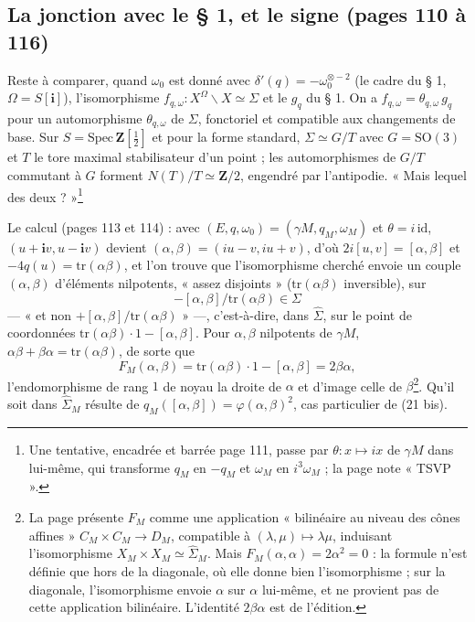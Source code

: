 \documentclass[11pt,a4paper]{article}
\begin{document}
\subsection*{La jonction avec le § 1, et le signe (pages 110 à 116)}

Reste à comparer, quand $\omega_0$ est donné avec $\delta'(q) = -\omega_0^{\otimes -2}$
(le cadre du § 1, $\Omega = S[\mathbf{i}]$), l'isomorphisme $f_{q, \omega} :
X^{\Omega} \smallsetminus X \simeq \Sigma$ et le $g_q$ du § 1. On a $f_{q, \omega} =
\theta_{q, \omega}\, g_q$ pour un automorphisme $\theta_{q, \omega}$ de $\Sigma$,
fonctoriel et compatible aux changements de base. Sur $S = \mathrm{Spec}\,
\mathbf{Z}[\tfrac{1}{2}]$ et pour la forme standard, $\Sigma \simeq G/T$ avec $G =
\mathrm{SO}(3)$ et $T$ le tore maximal stabilisateur d'un point ; les automorphismes
de $G/T$ commutant à $G$ forment $N(T)/T \simeq \mathbf{Z}/2$, engendré par
l'antipodie. « Mais lequel des deux ? »\footnote{Une tentative, encadrée et barrée
page 111, passe par $\theta : x \mapsto ix$ de $\gamma M$ dans lui-même, qui transforme
$q_M$ en $-q_M$ et $\omega_M$ en $i^3\omega_M$ ; la page note « TSVP ».}

Le calcul (pages 113 et 114) : avec $(E, q, \omega_0) = (\gamma M, q_M, \omega_M)$ et
$\theta = i\,\mathrm{id}$, $(u + \mathbf{i}v, u - \mathbf{i}v)$ devient $(\alpha,
\beta) = (iu - v, iu + v)$, d'où $2i[u, v] = [\alpha, \beta]$ et $-4q(u) =
\mathrm{tr}(\alpha\beta)$, et l'on trouve que l'isomorphisme cherché envoie un couple
$(\alpha, \beta)$ d'éléments nilpotents, « assez disjoints » ($\mathrm{tr}(\alpha\beta)$
inversible), sur
\[
  -[\alpha, \beta]/\mathrm{tr}(\alpha\beta) \in \Sigma
\]
— « et non $+[\alpha, \beta]/\mathrm{tr}(\alpha\beta)$ » —, c'est-à-dire, dans
$\hat{\Sigma}$, sur le point de coordonnées $\mathrm{tr}(\alpha\beta)\cdot 1 - [\alpha,
\beta]$. Pour $\alpha, \beta$ nilpotents de $\gamma M$, $\alpha\beta + \beta\alpha =
\mathrm{tr}(\alpha\beta)$, de sorte que
\[
  F_M(\alpha, \beta) = \mathrm{tr}(\alpha\beta)\cdot 1 - [\alpha, \beta] = 2\beta\alpha,
\]
l'endomorphisme de rang $1$ de noyau la droite de $\alpha$ et d'image celle de
$\beta$\footnote{La page présente $F_M$ comme une application « bilinéaire au niveau
des cônes affines » $C_M \times C_M \to D_M$, compatible à $(\lambda, \mu) \mapsto
\lambda\mu$, induisant l'isomorphisme $X_M \times X_M \simeq \hat{\Sigma}_M$. Mais
$F_M(\alpha, \alpha) = 2\alpha^2 = 0$ : la formule n'est définie que hors de la
diagonale, où elle donne bien l'isomorphisme ; sur la diagonale, l'isomorphisme
envoie $\alpha$ sur $\alpha$ lui-même, et ne provient pas de cette application
bilinéaire. L'identité $2\beta\alpha$ est de l'édition.}. Qu'il soit dans
$\hat{\Sigma}_M$ résulte de $q_M([\alpha, \beta]) = \varphi(\alpha, \beta)^2$, cas
particulier de (21 bis).
\end{document}

